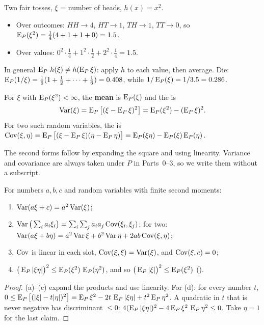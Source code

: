 \begin{example}
Two fair tosses, $\xi$ = number of heads, $h(x)=x^2$.
\begin{itemize}
  \item Over outcomes: $HH\to4$, $HT\to1$, $TH\to1$, $TT\to0$, so $\operatorname{E}_P(\xi^2)=\frac14(4+1+1+0)=1.5$.
  \item Over values: $0^2\cdot\frac14+1^2\cdot\frac12+2^2\cdot\frac14=1.5$.
\end{itemize}
\end{example}

In general $\operatorname{E}_P\,h(\xi)\ne h(\operatorname{E}_P\xi)$: apply $h$ to each value, then average. Die: $\operatorname{E}_P(1/\xi)=\frac16(1+\frac12+\dots+\frac16)=0.408$, while $1/\operatorname{E}_P(\xi)=1/3.5=0.286$.

\begin{definition}
\label{def:var}
For $\xi$ with $\operatorname{E}_P(\xi^2)<\infty$, the \textbf{mean} is $\operatorname{E}_P(\xi)$ and the  is
\[
  \operatorname{Var}(\xi)=\operatorname{E}_P\big[(\xi-\operatorname{E}_P\xi)^2\big]=\operatorname{E}_P(\xi^2)-(\operatorname{E}_P\xi)^2 .
\]
For two such random variables, the  is $\operatorname{Cov}(\xi,\eta)=\operatorname{E}_P\big[(\xi-\operatorname{E}_P\xi)(\eta-\operatorname{E}_P\eta)\big]=\operatorname{E}_P(\xi\eta)-\operatorname{E}_P(\xi)\operatorname{E}_P(\eta)$.
\end{definition}
The second forms follow by expanding the square and using linearity. Variance and covariance are always taken under $P$ in Parts~0--3, so we write them without a subscript.

\begin{result}
\label{res:var-rules}
For numbers $a,b,c$ and random variables with finite second moments:
\begin{enumerate}[label=(\alph*)]
  \item $\operatorname{Var}(a\xi+c)=a^2\operatorname{Var}(\xi)$;
  \item $\operatorname{Var}\big(\sum_i a_i\xi_i\big)=\sum_i\sum_j a_ia_j\operatorname{Cov}(\xi_i,\xi_j)$; for two: $\operatorname{Var}(a\xi+b\eta)=a^2\operatorname{Var}\xi+b^2\operatorname{Var}\eta+2ab\operatorname{Cov}(\xi,\eta)$;
  \item $\operatorname{Cov}$ is linear in each slot, $\operatorname{Cov}(\xi,\xi)=\operatorname{Var}(\xi)$, and $\operatorname{Cov}(\xi,c)=0$;
  \item $\big(\operatorname{E}_P|\xi\eta|\big)^2\le\operatorname{E}_P(\xi^2)\,\operatorname{E}_P(\eta^2)$, and so $\big(\operatorname{E}_P|\xi|\big)^2\le\operatorname{E}_P(\xi^2)$ \;().
\end{enumerate}
\end{result}
\begin{proof}
(a)--(c) expand the products and use linearity. For (d): for every number $t$, $0\le\operatorname{E}_P\big[(|\xi|-t|\eta|)^2\big]=\operatorname{E}_P\xi^2-2t\,\operatorname{E}_P|\xi\eta|+t^2\operatorname{E}_P\eta^2$. A quadratic in $t$ that is never negative has discriminant $\le0$: $4(\operatorname{E}_P|\xi\eta|)^2-4\operatorname{E}_P\xi^2\,\operatorname{E}_P\eta^2\le0$. Take $\eta=1$ for the last claim.
\end{proof}

